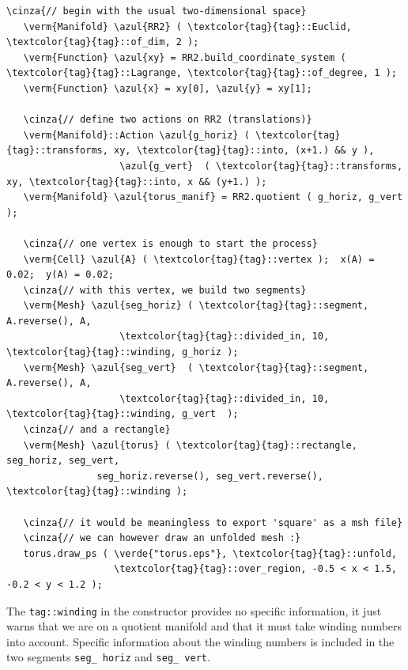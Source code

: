 \begin{Verbatim}[commandchars=\\\{\},formatcom=\small\tt,frame=single,
   label=parag-\ref{\numb section 7.\numb parag 4}.cpp,rulecolor=\color{coment},
   baselinestretch=0.94,framesep=2mm                                            ]
   \cinza{// begin with the usual two-dimensional space}
   \verm{Manifold} \azul{RR2} ( \textcolor{tag}{tag}::Euclid, \textcolor{tag}{tag}::of_dim, 2 );
   \verm{Function} \azul{xy} = RR2.build_coordinate_system ( \textcolor{tag}{tag}::Lagrange, \textcolor{tag}{tag}::of_degree, 1 );
   \verm{Function} \azul{x} = xy[0], \azul{y} = xy[1];

   \cinza{// define two actions on RR2 (translations)}
   \verm{Manifold}::Action \azul{g_horiz} ( \textcolor{tag}{tag}::transforms, xy, \textcolor{tag}{tag}::into, (x+1.) && y ),
                    \azul{g_vert}  ( \textcolor{tag}{tag}::transforms, xy, \textcolor{tag}{tag}::into, x && (y+1.) );
   \verm{Manifold} \azul{torus_manif} = RR2.quotient ( g_horiz, g_vert );

   \cinza{// one vertex is enough to start the process}
   \verm{Cell} \azul{A} ( \textcolor{tag}{tag}::vertex );  x(A) = 0.02;  y(A) = 0.02;
   \cinza{// with this vertex, we build two segments}
   \verm{Mesh} \azul{seg_horiz} ( \textcolor{tag}{tag}::segment, A.reverse(), A,
                    \textcolor{tag}{tag}::divided_in, 10, \textcolor{tag}{tag}::winding, g_horiz );
   \verm{Mesh} \azul{seg_vert}  ( \textcolor{tag}{tag}::segment, A.reverse(), A,
                    \textcolor{tag}{tag}::divided_in, 10, \textcolor{tag}{tag}::winding, g_vert  );
   \cinza{// and a rectangle}
   \verm{Mesh} \azul{torus} ( \textcolor{tag}{tag}::rectangle, seg_horiz, seg_vert,
                seg_horiz.reverse(), seg_vert.reverse(), \textcolor{tag}{tag}::winding );

   \cinza{// it would be meaningless to export 'square' as a msh file}
   \cinza{// we can however draw an unfolded mesh :}
   torus.draw_ps ( \verde{"torus.eps"}, \textcolor{tag}{tag}::unfold,
                   \textcolor{tag}{tag}::over_region, -0.5 < x < 1.5, -0.2 < y < 1.2 );
\end{Verbatim}

The {\small\tt\textcolor{tag}{tag}::winding} in the constructor {\small{}
} provides no specific information, it just warns {\maniFEM} that
we are on a quotient manifold and that it must take winding numbers into account.
Specific information about the winding numbers is included in the two segments
{\small\tt seg\_\,horiz} and {\small\tt seg\_\,vert}.

